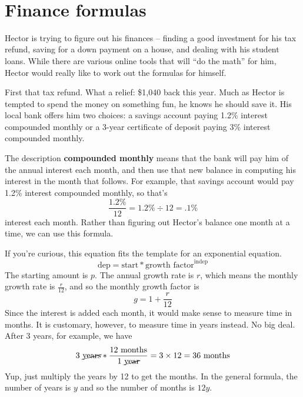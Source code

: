  ~\vspace{.1in}
 
\section{Finance formulas}

Hector is trying to figure out his finances -- finding a good investment for his tax refund, saving for a down payment on a house, and dealing with his student loans.  While there are various online tools that will ``do the math'' for him, Hector would really like to work out the formulas for himself.

First that tax refund.  What a relief:  \$1,040 back this year.  Much as Hector is tempted to spend the money on something fun, he knows he should save it.  His local bank offers him two choices:  a savings account paying 1.2\% interest compounded monthly or a 3-year certificate of deposit paying 3\% interest compounded monthly.  

The description \textbf{compounded monthly} means that the bank will pay him  of the annual interest each month, and then use that new balance in computing his interest in the month that follows.  For example, that savings account would pay 1.2\% interest compounded monthly, so  that's $$\frac{1.2\%}{12}= 1.2\% \div 12 = .1\%$$ interest each month.  Rather than figuring out Hector's balance one month at a time, we can use this formula.

 \bigskip
\bigskip

If you're curious, this equation fits the template for an exponential equation.  
$$\text{dep} = \text{start} \ast \text{growth factor} ^ {\text{indep}}$$
The starting amount is $p$.  The annual growth rate is $r$, which means the monthly growth rate is $\frac{r}{12}$, and so the monthly growth factor is 
$$g=1+\frac{r}{12}$$ 
Since the interest is added each month, it would make sense to measure time in months.  It is customary, however, to measure time in years instead.  No big deal.  After 3 years, for example, we have 
$$3 \text{ \cancel{years}} \ast \frac{12 \text{ months}}{1\text{ \cancel{year}}} = 3 \times 12 = 36 \text{ months}$$  
Yup, just multiply the years by 12 to get the months.  In the general formula, the number of years is $y$ and so the number of months is $12y$.

